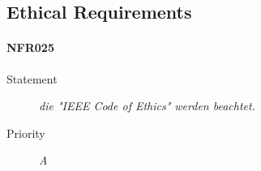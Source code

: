 \subsection{Ethical Requirements}

\paragraph{NFR025}
\begin{description}
\item[Statement] \textit{die "IEEE Code of Ethics" werden beachtet.}
\item[Priority] \textit{A}
\end{description}